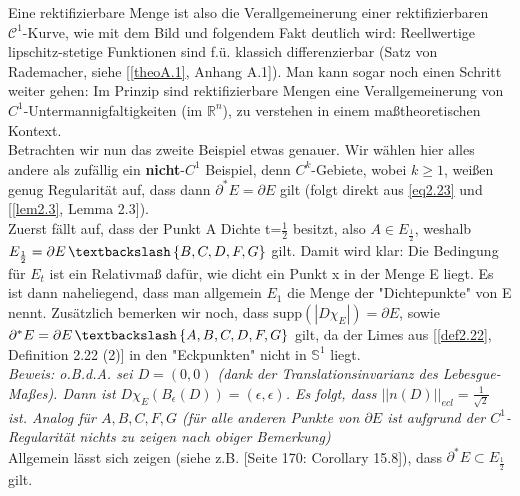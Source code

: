 Eine rektifizierbare Menge ist also die Verallgemeinerung einer rektifizierbaren \\\(\mathcal{C}^1\)-Kurve, wie mit dem Bild und folgendem Fakt deutlich wird: Reellwertige lipschitz-stetige Funktionen sind f.ü. klassich differenzierbar (Satz von Rademacher, siehe [\ref{theoA.1}, Anhang A.1]). Man kann sogar noch einen Schritt weiter gehen: Im Prinzip sind rektifizierbare Mengen eine Verallgemeinerung von \(C^1\)-Untermannigfaltigkeiten (im \(\mathbb{R}^n\)), zu verstehen in einem maßtheoretischen Kontext.\\
Betrachten wir nun das zweite Beispiel etwas genauer. Wir wählen hier alles andere als zufällig ein \textbf{nicht}-\(C^1\) Beispiel, denn \(C^k\)-Gebiete, wobei \(k \geq 1\), weißen genug Regularität auf, dass dann \(\partial^* E = \partial E\) gilt (folgt direkt aus \eqref{eq2.23} und [\ref{lem2.3}, Lemma 2.3]).\\
Zuerst fällt auf, dass der Punkt A Dichte t=\(\frac{1}{2}\) besitzt, also \(A \in E_{\frac{1}{2}}\), weshalb \(E_{\frac{1}{2}} = \partial E \, \textbackslash \, \{B,C,D,F,G\}\) gilt. Damit wird klar: Die Bedingung für \(E_t\) ist ein Relativmaß dafür, wie dicht ein Punkt x in der Menge E liegt. Es ist dann naheliegend, dass man allgemein \(E_1\) die Menge der "Dichtepunkte" von E nennt. Zusätzlich bemerken wir noch, dass \(\text{supp} (|D \chi_E |) = \partial E\), sowie \(\partial^* E = \partial E \, \textbackslash \, \{A,B,C,D,F,G\}\) gilt, da der Limes aus [\ref{def2.22}, Definition 2.22 (2)] in den "Eckpunkten" nicht in \(\mathbb{S}^1\) liegt.\\ \textit{Beweis: o.B.d.A. sei \(D=(0,0)\) (dank der Translationsinvarianz des Lebesgue-Maßes). Dann ist \(D\chi_E (B_{\epsilon}(D)) = (\epsilon,\epsilon)\). Es folgt, dass \(||n(D)||_{ecl} = \frac{1}{\sqrt{2}}\) ist. Analog für \(A,B,C,F,G\) (für alle anderen Punkte von \(\partial E\) ist aufgrund der \(C^1\)-Regularität nichts zu zeigen nach obiger Bemerkung) \QEDB}\\
Allgemein lässt sich zeigen (siehe z.B. \cite{maggi2012sets}[Seite 170: Corollary 15.8]), dass \(\partial^* E \subset E_{\frac{1}{2}}\) gilt.\\

